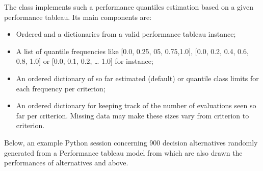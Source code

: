 \documentclass[a4paper,10pt,english]{sphinxhowto}
\begin{document}
The  class implements such a performance quantiles estimation based on a given performance tableau. Its main components are:
\begin{itemize}
\item {} 
Ordered  and a  dictionaries from a valid performance tableau instance;

\item {} 
A list  of quantile frequencies like  {[}0.0, 0.25, 05, 0.75,1.0{]},  {[}0.0, 0.2, 0.4, 0.6, 0.8, 1.0{]} or  {[}0.0, 0.1, 0.2, … 1.0{]} for instance;

\item {} 
An ordered  dictionary  of so far estimated  (default) or  quantile class limits for each frequency per criterion;

\item {} 
An ordered dictionary  for keeping track of the number of evaluations seen so far per criterion. Missing data may make these sizes vary from criterion to criterion.

\end{itemize}

Below, an example Python session concerning 900 decision alternatives randomly generated from a  Performance tableau model from which are also drawn the performances of alternatives  and  above.

\begin{sphinxVerbatim}[commandchars=\\\{\},numbers=left,firstnumber=1,stepnumber=1]
\PYG{g+go}{ dict\PYGZus{}keys([\PYGZsq{}objectives\PYGZsq{}, \PYGZsq{}LowerClosed\PYGZsq{}, \PYGZsq{}name\PYGZsq{},}
\PYG{g+go}{ \PYGZsq{}limitingQuantiles\PYGZsq{}, ... ])}
\end{sphinxVerbatim}
\end{document}
